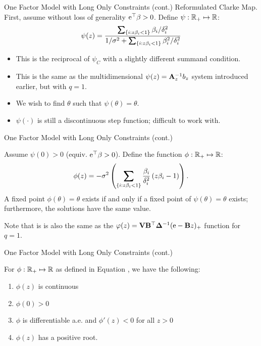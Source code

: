 \documentclass[11pt,leqno]{beamer}
\begin{document}
\begin{frame}{One Factor Model with Long Only Constraints (cont.)}
Reformulated Clarke Map.  First, assume without loss of generality $\mathrm{e}^\top \beta>0$.  Define $\psi: \mathbb{R}_+  \mapsto \mathbb{R}$:
\begin{equation}\label{psieq}
\psi(z) = \frac{\sum_{\{i:z\gb_i<1\}} \gb_i/\gd_i^2}{1/\gs^2+ \sum_{ \{i:z\gb_i<1\} } \gb_i^2/\gd_i^2}
\end{equation}
\begin{itemize}
\item This is the reciprocal of $\psi_C$ with a slightly different summand condition.
\item This is the same as the multidimensional $\psi(z) = \mathbf{A}_z^{-1}b_z$ system introduced earlier, but with $q=1$.
\item We wish to find $\theta$ such that $\psi(\theta) = \theta$.  
\item$\psi(\cdot)$ is still a discontinuous step function; difficult to work with.
\end{itemize}
\end{frame}


\begin{frame}{One Factor Model with Long Only Constraints (cont.)}
\begin{lemma} Assume $\psi(0)>0$ (equiv. $\mathrm{e}^\top \beta>0$).  Define the function $\phi: \mathbb{R}_+ \mapsto \mathbb{R}$:
\begin{equation}\label{phi}
\phi(z) = -\gs^2\paren{ \sum_{\{i:z\gb_i<1\}} \frac{\gb_i}{\gd_i^2}\paren{z \gb_i-1}}.
\end{equation}
A fixed point $\phi(\theta) = \theta$ exists if and only if a fixed point of $\psi(\theta) = \theta$ exists; furthermore, the solutions have the same value.
\end{lemma}
Note that is is also the same as the $\varphi(z)=\mathbf{V} \mathbf{B}^\top \bm{\Delta}^{-1}(\mathrm{e}-\mathbf{B} z)_+$ function for $q=1$.
\end{frame}

\begin{frame}{One Factor Model with Long Only Constraints (cont.)}
\begin{lemma}
For $\phi:\mathbb{R}_+ \mapsto \mathbb{R}$ as defined in Equation , we have the following:
\begin{enumerate}
\item $\phi(z)$ is continuous
\item $\phi(0)>0$
\item $\phi$ is differentiable a.e. and $\phi'(z)<0$ for all $z>0$
\item $\phi(z)$ has a positive root.
\end{enumerate}
\end{lemma}
\end{frame}
\end{document}
